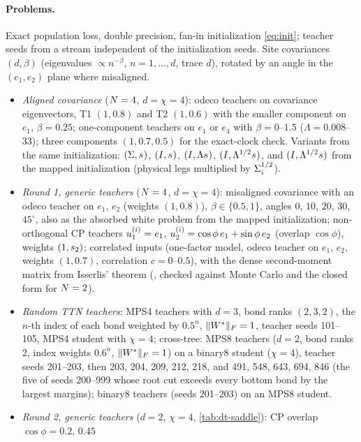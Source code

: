\paragraph{Problems.}
Exact population loss, double precision, fan-in initialization \eqref{eq:init}; teacher seeds from a
stream independent of the initialization seeds. Site covariances $(d,\beta)$
(eigenvalues $\propto n^{-\beta}$, $n=1,\dots,d$, trace $d$), rotated by an angle in the $(e_1,e_2)$ plane where misaligned.
\begin{itemize}
  \item \emph{Aligned covariance} ($N=4$, $d=\chi=4$): odeco teachers on covariance eigenvectors, T1 $(1,0.8)$
    and T2 $(1,0.6)$ with the smaller component on $e_1$, $\beta=0.25$; one-component teachers on $e_1$ or $e_4$
    with $\beta=0$--$1.5$ ($\Lambda=0.008$--$33$); three components $(1,0.7,0.5)$ for the exact-clock check. Variants
    from the same initialization: $(\Sigma,s_{})$, $(I,s_{})$, $(I,\Lambda s_{})$, $(I,\Lambda^{1/2}s_{})$, and $(I,\Lambda^{1/2}s_{})$
    from the mapped initialization (physical legs multiplied by $\Sigma_{i}^{1/2}$).
  \item \emph{Round 1, generic teachers} ($N=4$, $d=\chi=4$): misaligned covariance with an odeco teacher on
    $e_1$, $e_2$ (weights $(1,0.8)$), $\beta\in\{0.5,1\}$, angles $0$, $10$, $20$, $30$, $45^\circ$, also as the absorbed
    white problem from the mapped initialization; non-orthogonal CP teachers $u_{1}^{(i)}=e_1$,
    $u_{2}^{(i)}=\cos\phi\,e_1+\sin\phi\,e_2$ (overlap $\cos\phi$), weights $(1,s_{2})$; correlated inputs (one-factor model,
    odeco teacher on $e_1$, $e_2$, weights $(1,0.7)$, correlation $c=0$--$0.5$), with
    the dense second-moment matrix from Isserlis' theorem (, checked against Monte
    Carlo and the closed form for $N=2$).
  \item \emph{Random TTN teachers}: MPS4 teachers with $d=3$, bond ranks $(2,3,2)$, the $n$-th index of each bond
    weighted by $0.5^n$, $\lVert W^{*}\rVert_{F}=1$, teacher seeds 101--105, MPS4 student with $\chi=4$; cross-tree: MPS8 teachers
    ($d=2$, bond ranks 2, index weights $0.6^n$, $\lVert W^{*}\rVert_{F}=1$) on a binary8 student ($\chi=4$), teacher seeds 201--203,
    then 203, 204, 209, 212, 218, and 491, 548, 643, 694, 846 (the five of seeds 200--999 whose root cut
    exceeds every bottom bond by the largest margins); binary8 teachers (seeds 201--203) on an MPS8 student.
  \item \emph{Round 2, generic teachers} ($d=2$, $\chi=4$, \cref{tab:dt-saddle}): CP overlap $\cos\phi=0.2$, $0.45$

\end{itemize}
